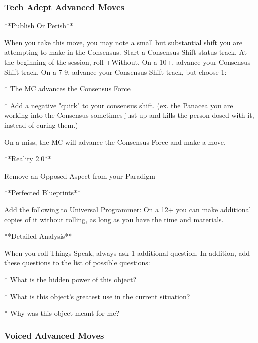 \documentclass[
  oneside,
  statementpaper,
  9pt]{memoir}
\begin{document}
\hypertarget{tech-adept-advanced-moves}{%
\subsubsection{Tech Adept Advanced
Moves}\label{tech-adept-advanced-moves}}

\begin{Player}

**Publish Or Perish**

 When you take this move, you may note a small but substantial shift you are attempting to make in the Consensus. Start a Consensus Shift status track. At the beginning of the session, roll +Without. On a 10+, advance your Consensus Shift track. On a 7-9, advance your Consensus Shift track, but choose 1:

* The MC advances the Consensus Force

* Add a negative "quirk" to your consensus shift. (ex. the Panacea you are working into the Consensus sometimes just up and kills the person dosed with it, instead of curing them.)

On a miss, the MC will advance the Consensus Force and make a move.

**Reality 2.0**

Remove an Opposed Aspect from your Paradigm

**Perfected Blueprints**

Add the following to Universal Programmer: On a 12+ you can make additional copies of it without rolling, as long as you have the time and materials.

**Detailed Analysis**

When you roll Things Speak, always ask 1 additional question. In addition, add these questions to the list of possible questions:

* What is the hidden power of this object?

* What is this object’s greatest use in the current situation?

* Why was this object meant for me?

\end{Player}

\hypertarget{voiced-advanced-moves}{%
\subsubsection{Voiced Advanced Moves}\label{voiced-advanced-moves}}
\end{document}
